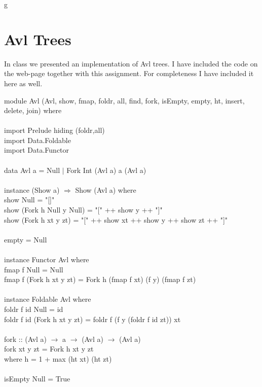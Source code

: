 \documentclass[11pt]{article}
\begin{document}
g\section{Avl Trees}

In class we presented an implementation of Avl trees.  I have included the code
on the web-page together with this assignment.  For completeness I have included it here as well.


\begin{smallprogram*}
\>module Avl (Avl, show, fmap, foldr, all,  find, fork, isEmpty, empty, ht, insert, delete, join) where \\
\> \\
\>  import Prelude hiding (foldr,all) \\
\>  import Data.Foldable \\
\>  import Data.Functor \\
\> \\
\>  data Avl a = Null $\mid$ Fork Int (Avl a) a (Avl a)  \\
\> \\
\>  instance (Show a) $\Rightarrow$ Show (Avl a) where \\
\>    show Null = "[]" \\
\>    show (Fork h Null y Null) = "["  ++ show y ++ "]" \\
\>    show (Fork h xt y zt) = "[" ++ show xt ++ show y ++ show zt ++ "]" \\
\> \\
\>  empty = Null \\
\> \\
\>  instance Functor Avl where \\
\>    fmap f Null = Null \\
\>    fmap f (Fork h xt y zt) = Fork h (fmap f xt) (f y) (fmap f zt)   \\
\> \\
\>  instance Foldable Avl where \\
\>    foldr f id  Null = id \\
\>    foldr f id (Fork h xt y zt) = foldr f (f y (foldr f id zt)) xt \\
\> \\
\>  fork :: (Avl a) $\rightarrow$ a $\rightarrow$ (Avl a) $\rightarrow$ (Avl a) \\
\>  fork xt y zt = Fork h xt y zt \\
\>     where h = 1 + max (ht xt) (ht zt) \\
\> \\
\>  isEmpty Null = True \\

\end{smallprogram*}
\end{document}

